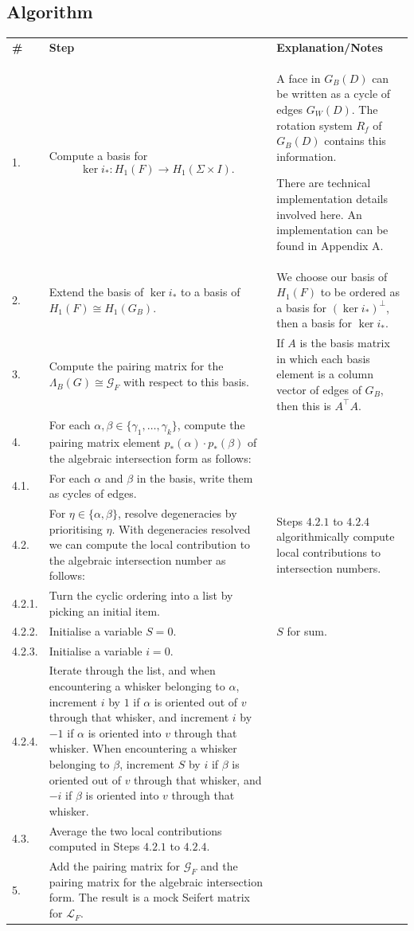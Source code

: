 \documentclass[12pt]{report}
\theoremstyle{upright}
\begin{document}
\subsection*{Algorithm}
{\def\arraystretch{1.6}
\begin{longtable}{p{}p{}p{}}
	\textbf{\#} & \textbf{Step}
	& \textbf{Explanation/Notes}\\
	1.
	& Compute a basis for \[\ker i_{*}: H_{1}(F) \to H_{1}(\Sigma \times I).\]
	& A face in $G_{B}(D)$ can be written as a cycle of edges $G_{W}(D)$. The rotation system $R_{f}$ of $G_{B}(D)$ contains this information.
	
	There are technical implementation details involved here. An implementation can be found in Appendix A.\\
	2.
	& Extend the basis of $\ker i_{*}$ to a basis of ${H_{1}(F) \cong H_{1}(G_{B})}$.
	& We choose our basis of $H_{1}(F)$ to be ordered as a basis for $(\ker i_{*})^{\perp}$, then a basis for $\ker i_{*}$.\\
	3.
	& Compute the pairing matrix for the $\Lambda_{B}(G) \cong \mathcal{G}_{F}$ with respect to this basis.
	& If $A$ is the basis matrix in which each basis element is a column vector of edges of $G_{B}$, then this is $A^{\top}A$.\\
	4.
	& For each $\alpha, \beta \in \{\gamma_{1}, \dots, \gamma_{k}\}$, compute the pairing matrix element $p_{*}(\alpha) \cdot p_{*}(\beta)$ of the algebraic intersection form as follows:
	& \\
	4.1. 
	& For each $\alpha$ and $\beta$ in the basis, write them as cycles of edges.
	& \\
	4.2. 
	& For $\eta \in \{\alpha, \beta\}$, resolve degeneracies by prioritising $\eta$. With degeneracies resolved we can compute the local contribution to the algebraic intersection number as follows:
	& Steps $4.2.1$ to $4.2.4$ algorithmically compute local contributions to intersection numbers.\\
	4.2.1.
	& Turn the cyclic ordering into a list by picking an initial item.
	& \\
	4.2.2.
	& Initialise a variable $S = 0$.
	& $S$ for sum.\\
	4.2.3.
	& Initialise a variable $i = 0$.
	& \\
	4.2.4.
	& Iterate through the list, and when encountering a whisker belonging to $\alpha$, increment $i$ by $1$ if $\alpha$ is oriented out of $v$ through that whisker, and increment $i$ by $-1$ if $\alpha$ is oriented into $v$ through that whisker. When encountering a whisker belonging to $\beta$, increment $S$ by $i$ if $\beta$ is oriented out of $v$ through that whisker, and $-i$ if $\beta$ is oriented into $v$ through that whisker.
	& \\
	4.3.
	& Average the two local contributions computed in Steps $4.2.1$ to $4.2.4$.
	& \\
	5.
	& Add the pairing matrix for $\mathcal{G}_{F}$ and the pairing matrix for the algebraic intersection form. The result is a mock Seifert matrix for $\mathcal{L}_{F}$.
\end{longtable}
}
\end{document}

